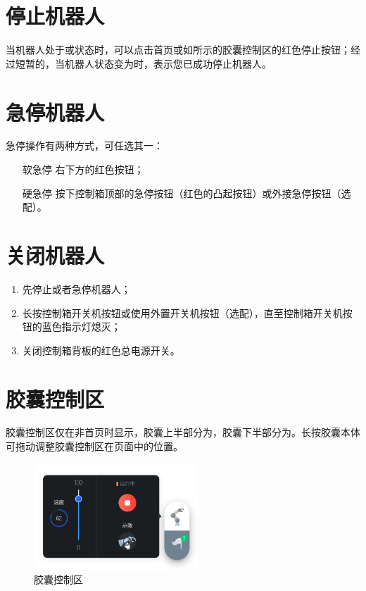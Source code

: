 \section{停止机器人}
当机器人处于或状态时，可以点击首页或如所示的胶囊控制区的红色停止按钮；经过短暂的，当机器人状态变为时，表示您已成功停止机器人。


\section{急停机器人}

急停操作有两种方式，可任选其一：
\begin{itemize}[leftmargin=3.5em]
	\item[软急停] \LM 右下方的红色按钮；
	\item[硬急停] 按下控制箱顶部的急停按钮（红色的凸起按钮）或外接急停按钮（选配）。
\end{itemize}


\section{关闭机器人}
\begin{enumerate}
	\item 先停止或者急停机器人；
	\item 长按控制箱开关机按钮或使用外置开关机按钮（选配），直至控制箱开关机按钮的蓝色指示灯熄灭；
	\item 关闭控制箱背板的红色总电源开关。
\end{enumerate}


\section{胶囊控制区}
胶囊控制区仅在非首页时显示，胶囊上半部分为，胶囊下半部分为。长按胶囊本体可拖动调整胶囊控制区在页面中的位置。

\begin{figure}[hb]
	\centering
	\includegraphics[height=4cm]{screen/2-18.png}
	\caption{胶囊控制区}
	\label{fig:胶囊控制区}
\end{figure}

